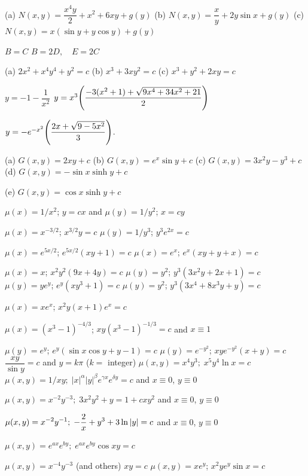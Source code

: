 (a)  $N(x,y)=\dfrac{x^4y}{2}+x^2+6xy+g(y)$
(b) $N(x,y)=\dfrac{x}{y}+2y\sin x+g(y)$
(c)   $N(x,y)=x(\sin y+y\cos y)+g(y)$

   $B=C$
   $B=2D,\quad E=2C$

(a)  $2x^2+x^4y^4+y^2=c$
(b)  $x^3+3xy^2=c$
(c)  $x^3+y^2+2xy=c$

 $y=-1-\dfrac{1}{x^2}$
 $y=x^3\displaystyle{\left(\frac{-3(x^2+1)+\sqrt{9x^4+34x^2+21}}{2}\right)}$

 $y=-e^{-x^2}\displaystyle{\left(\frac{2x+\sqrt{9-5x^2}}{3}\right)}$.

(a)  $G(x,y)=2xy+c$
(b)  $G(x,y)=e^x\sin y+c$
(c)  $G(x,y)=3x^2y-y^3+c$
(d)  $G(x,y)=-\sin x\sinh y+c$

(e)  $G(x,y)=\cos x\sinh y+c$



 $\mu(x)=1/x^2$;\; $y=cx$ and $\mu(y)=1/y^2$;    $x=cy$

 $\mu(x)=x^{-3/2}$;\; $x^{3/2}y=c$
 $\mu(y)={1/y^3}$;\; $y^3e^{2x}=c$

$\mu(x)=e^{5x/2}$;\; $e^{5x/2}(xy+1)=c$
  $\mu(x)=e^x$;\; $e^x(xy+y+x)=c$

 $\mu(x)=x$;\;  $x^2y^2(9x+4y)=c$
 $\mu(y)=y^2$;\; $y^3(3x^2y+2x+1)=c$
 $\mu(y)=ye^y$;\; $e^y(xy^3+1)=c$
 $\mu(y)=y^2$;   $y^3(3x^4+8x^3y+y)=c$

 $\mu(x)=xe^x$;\; $x^2y(x+1)e^x=c$

 $\mu(x)=(x^3-1)^{-4/3}$;\; $xy(x^3-1)^{-1/3}=c$ and
$x\equiv1$

$\mu(y)=e^y$;\; $e^y(\sin x\cos y+y-1)=c$
 $\mu(y)=e^{-y^2}$;   $xye^{-y^2}(x+y)=c$
 $\dfrac{xy}{\sin y}=c$  and $y=k\pi$ ($k=$ integer)
  $\mu(x,y)=x^4y^3;\; x^5y^4\ln x=c$
  $\mu(x,y)=1/xy;\; |x|^\alpha |y|^\beta e^{\gamma
x}e^{\delta y}=c$
 and $x\equiv0$, $y\equiv0$

  $\mu(x,y)=x^{-2}y^{-3};\; 3x^2y^2+y=1+cxy^2$ and
$x\equiv0$, $y\equiv0$

 $\displaystyle{\mu(x,y) =x^{-2}y^{-1};\; -\frac{2}{x}+y^3+3\ln
|y|=c}$ and $x\equiv0$, $y\equiv0$

 $\mu(x,y)=e^{ax}e^{by};\; e^{ax}e^{by}\cos xy=c$

  $\mu(x,y)= x^{-4}y^{-3}$ (and others)\; $xy=c$
 $\mu(x,y)=xe^y$;    $x^2 ye^y\sin x=c$

